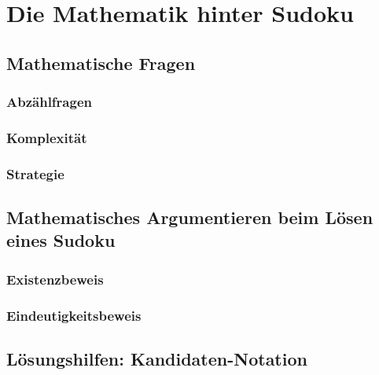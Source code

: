 
\chapter{Die Mathematik hinter Sudoku}

\section{Mathematische Fragen}
\subsection{Abzählfragen}
\subsection{Komplexität}
\subsection{Strategie}


\section{Mathematisches Argumentieren beim Lösen eines Sudoku}
\subsection{Existenzbeweis}
\subsection{Eindeutigkeitsbeweis}

\section{Lösungshilfen: Kandidaten-Notation}
